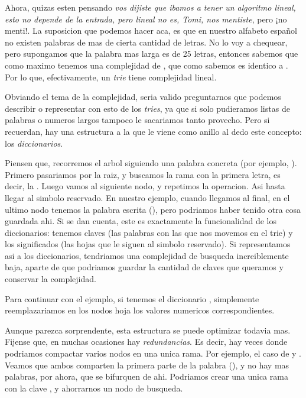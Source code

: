 \documentclass{article}
\begin{document}
Ahora, quizas esten pensando \textit{vos dijiste que ibamos a tener un algoritmo lineal, esto no depende de la entrada, pero lineal no es, Tomi, nos mentiste}, pero ¡no menti!. La suposicion que podemos hacer aca, es que en nuestro alfabeto español no existen palabras de mas de cierta cantidad de letras. No lo voy a chequear, pero supongamos que la palabra mas larga es de 25 letras, entonces sabemos que como maximo tenemos una complejidad de , que como sabemos es identico a . Por lo que, efectivamente, un \textit{trie} tiene complejidad lineal.

Obviando el tema de la complejidad, seria valido preguntarnos que podemos describir o representar con esto de los \textit{tries}, ya que si solo pudieramos listas de palabras o numeros largos tampoco le sacariamos tanto provecho. Pero si recuerdan, hay una estructura a la que le viene como anillo al dedo este concepto: los \textit{diccionarios}.

Piensen que, recorremos el arbol siguiendo una palabra concreta (por ejemplo, ). Primero pasariamos por la raiz, y buscamos la rama con la primera letra, es decir, la . Luego vamos al siguiente nodo, y repetimos la operacion. Asi hasta llegar al simbolo reservado. En nuestro ejemplo, cuando llegamos al final, en el ultimo nodo tenemos la palabra escrita (), pero podriamos haber tenido otra cosa guardada ahi. Si se dan cuenta, este es exactamente la funcionalidad de los diccionarios: tenemos claves (las palabras con las que nos movemos en el trie) y los significados (las hojas que le siguen al simbolo reservado). Si representamos asi a los diccionarios, tendriamos una complejidad de busqueda increiblemente baja, aparte de que podriamos guardar la cantidad de claves que queramos y conservar la complejidad.

Para continuar con el ejemplo, si tenemos el diccionario , simplemente reemplazariamos en los nodos hoja los valores numericos correspondientes.

Aunque parezca sorprendente, esta estructura se puede optimizar todavia mas. Fijense que, en muchas ocasiones hay \textit{redundancias}. Es decir, hay veces donde podriamos compactar varios nodos en una unica rama. Por ejemplo, el caso de  y . Veamos que ambos comparten la primera parte de la palabra (), y no hay mas palabras, por ahora, que se bifurquen de ahi. Podriamos crear una unica rama con la clave , y ahorrarnos un nodo de busqueda.
\end{document}
